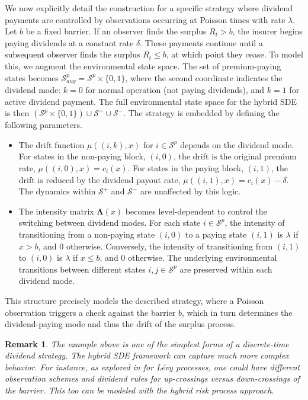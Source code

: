 \documentclass[11pt]{article}
\numberwithin{table}{section}
\numberwithin{figure}{section}
\numberwithin{equation}{section}
\newcommand{\1}{{\mathbf 1}}
\newcommand{\0}{\mat{0}}
\newtheorem{remark}{Remark}[section]
\begin{document}
We now explicitly detail the construction for a specific strategy where dividend payments are controlled by observations occurring at Poisson times with rate \(\lambda\). Let \(b\) be a fixed barrier. If an observer finds the surplus \(R_t > b\), the insurer begins paying dividends at a constant rate \(\delta\). These payments continue until a subsequent observer finds the surplus \(R_t \le b\), at which point they cease. To model this, we augment the environmental state space. The set of premium-paying states becomes \(\mathcal{S}^p_{aug} = \mathcal{S}^p \times \{0,1\}\), where the second coordinate indicates the dividend mode: \(k=0\) for normal operation (not paying dividends), and \(k=1\) for active dividend payment. The full environmental state space for the hybrid SDE is then \((\mathcal{S}^p \times \{0,1\}) \cup \mathcal{S}^+ \cup \mathcal{S}^-\). The strategy is embedded by defining the following parameters.
\begin{itemize}
    \item The drift function \(\mu((i,k), x)\) for \(i \in \mathcal{S}^p\) depends on the dividend mode. For states in the non-paying block, \((i,0)\), the drift is the original premium rate, \(\mu((i,0),x) = c_i(x)\). For states in the paying block, \((i,1)\), the drift is reduced by the dividend payout rate, \(\mu((i,1),x) = c_i(x) - \delta\). The dynamics within \(\mathcal{S}^+\) and \(\mathcal{S}^-\) are unaffected by this logic.
    \item The intensity matrix \(\bm{\Lambda}(x)\) becomes level-dependent to control the switching between dividend modes. For each state \(i \in \mathcal{S}^p\), the intensity of transitioning from a non-paying state \((i,0)\) to a paying state \((i,1)\) is \(\lambda\) if \(x > b\), and 0 otherwise. Conversely, the intensity of transitioning from \((i,1)\) to \((i,0)\) is \(\lambda\) if \(x \le b\), and 0 otherwise. The underlying environmental transitions between different states \(i,j \in \mathcal{S}^p\) are preserved within each dividend mode. 
\end{itemize}
This structure precisely models the described strategy, where a Poisson observation triggers a check against the barrier \(b\), which in turn determines the dividend-paying mode and thus the drift of the surplus process.

\begin{remark}
The example above is one of the simplest forms of a discrete-time dividend strategy. The hybrid SDE framework can capture much more complex behavior. For instance, as explored in \cite{beelders2025evy} for Lévy processes, one could have different observation schemes and dividend rules for up-crossings versus down-crossings of the barrier. This too can be modeled with the hybrid risk process approach.
\end{remark}
\end{document}
